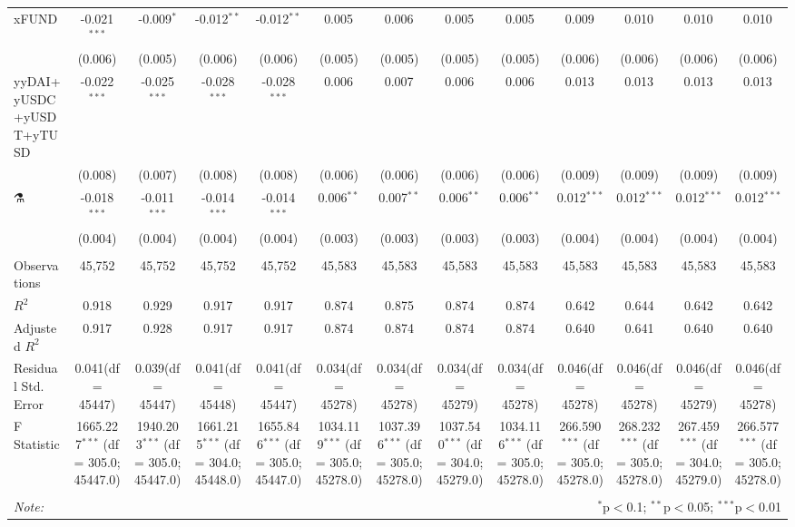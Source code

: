 \begin{table}[!htbp]
\begin{tabular}{@{\extracolsep{5pt}}lcccccccccccc}
 xFUND & -0.021$^{***}$ & -0.009$^{*}$ & -0.012$^{**}$ & -0.012$^{**}$ & 0.005$^{}$ & 0.006$^{}$ & 0.005$^{}$ & 0.005$^{}$ & 0.009$^{}$ & 0.010$^{}$ & 0.010$^{}$ & 0.010$^{}$ \\
  & (0.006) & (0.005) & (0.006) & (0.006) & (0.005) & (0.005) & (0.005) & (0.005) & (0.006) & (0.006) & (0.006) & (0.006) \\
 yyDAI+yUSDC+yUSDT+yTUSD & -0.022$^{***}$ & -0.025$^{***}$ & -0.028$^{***}$ & -0.028$^{***}$ & 0.006$^{}$ & 0.007$^{}$ & 0.006$^{}$ & 0.006$^{}$ & 0.013$^{}$ & 0.013$^{}$ & 0.013$^{}$ & 0.013$^{}$ \\
  & (0.008) & (0.007) & (0.008) & (0.008) & (0.006) & (0.006) & (0.006) & (0.006) & (0.009) & (0.009) & (0.009) & (0.009) \\
 ⚗️ & -0.018$^{***}$ & -0.011$^{***}$ & -0.014$^{***}$ & -0.014$^{***}$ & 0.006$^{**}$ & 0.007$^{**}$ & 0.006$^{**}$ & 0.006$^{**}$ & 0.012$^{***}$ & 0.012$^{***}$ & 0.012$^{***}$ & 0.012$^{***}$ \\
  & (0.004) & (0.004) & (0.004) & (0.004) & (0.003) & (0.003) & (0.003) & (0.003) & (0.004) & (0.004) & (0.004) & (0.004) \\
\hline \\[-1.8ex]
 Observations & 45,752 & 45,752 & 45,752 & 45,752 & 45,583 & 45,583 & 45,583 & 45,583 & 45,583 & 45,583 & 45,583 & 45,583 \\
 $R^2$ & 0.918 & 0.929 & 0.917 & 0.917 & 0.874 & 0.875 & 0.874 & 0.874 & 0.642 & 0.644 & 0.642 & 0.642 \\
 Adjusted $R^2$ & 0.917 & 0.928 & 0.917 & 0.917 & 0.874 & 0.874 & 0.874 & 0.874 & 0.640 & 0.641 & 0.640 & 0.640 \\
 Residual Std. Error & 0.041(df = 45447) & 0.039(df = 45447) & 0.041(df = 45448) & 0.041(df = 45447) & 0.034(df = 45278) & 0.034(df = 45278) & 0.034(df = 45279) & 0.034(df = 45278) & 0.046(df = 45278) & 0.046(df = 45278) & 0.046(df = 45279) & 0.046(df = 45278)  \\
 F Statistic & 1665.227$^{***}$ (df = 305.0; 45447.0) & 1940.203$^{***}$ (df = 305.0; 45447.0) & 1661.215$^{***}$ (df = 304.0; 45448.0) & 1655.846$^{***}$ (df = 305.0; 45447.0) & 1034.119$^{***}$ (df = 305.0; 45278.0) & 1037.396$^{***}$ (df = 305.0; 45278.0) & 1037.540$^{***}$ (df = 304.0; 45279.0) & 1034.116$^{***}$ (df = 305.0; 45278.0) & 266.590$^{***}$ (df = 305.0; 45278.0) & 268.232$^{***}$ (df = 305.0; 45278.0) & 267.459$^{***}$ (df = 304.0; 45279.0) & 266.577$^{***}$ (df = 305.0; 45278.0) \\
\hline
\hline \\[-1.8ex]
\textit{Note:} & \multicolumn{12}{r}{$^{*}$p$<$0.1; $^{**}$p$<$0.05; $^{***}$p$<$0.01} \\
\end{tabular}
\end{table}